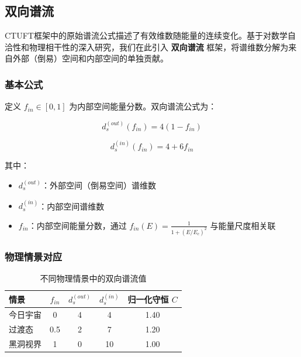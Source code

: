 
\subsection{双向谱流}
\label{sec:bidirectional_spectral_flow}

CTUFT框架中的原始谱流公式描述了有效维数随能量的连续变化。基于对数学自洽性和物理相干性的深入研究，我们在此引入 \textbf{双向谱流} 框架，将谱维数分解为来自外部（倒易）空间和内部空间的单独贡献。

\subsubsection{基本公式}

定义 $f_{in} \in [0,1]$ 为内部空间能量分数。双向谱流公式为：

\begin{equation}
\boxed{d_s^{(out)}(f_{in}) = 4(1 - f_{in})}
\label{eq:spectral_out}
\end{equation}

\begin{equation}
\boxed{d_s^{(in)}(f_{in}) = 4 + 6f_{in}}
\label{eq:spectral_in}
\end{equation}

其中：
\begin{itemize}
    \item $d_s^{(out)}$：外部空间（倒易空间）谱维数
    \item $d_s^{(in)}$：内部空间谱维数  
    \item $f_{in}$：内部空间能量分数，通过 $f_{in}(E) = \frac{1}{1+(E/E_c)^2}$ 与能量尺度相关联
\end{itemize}

\subsubsection{物理情景对应}

\begin{table}[h]
\centering
\begin{tabular}{lcccc}
\hline
\textbf{情景} & $f_{in}$ & $d_s^{(out)}$ & $d_s^{(in)}$ & \textbf{归一化守恒} $C$ \\
\hline
今日宇宙 & 0 & 4 & 4 & 1.40 \\
过渡态 & 0.5 & 2 & 7 & 1.20 \\
黑洞视界 & 1 & 0 & 10 & 1.00 \\
\hline
\end{tabular}
\caption{不同物理情景中的双向谱流值}
\label{tab:spectral_scenarios}
\end{table}

